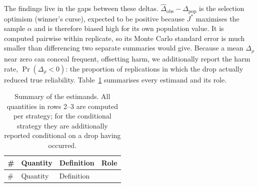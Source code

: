 \documentclass[
  nonatbib,
  authoryear,
  preprint]{elsarticle}
\begin{document}
The findings live in the gaps between these deltas.
\(\widehat{\Delta}_{\text{obs}} - \Delta_{\text{pop}}\) is the selection
optimism (winner's curse), expected to be positive because \(J^{*}\)
maximises the sample \(\alpha\) and is therefore biased high for its own
population value. It is computed pairwise within replicate, so its Monte
Carlo standard error is much smaller than differencing two separate
summaries would give. Because a mean \(\Delta_\rho\) near zero can
conceal frequent, offsetting harm, we additionally report the harm rate,
\(\Pr(\Delta_\rho < 0)\): the proportion of replications in which the
drop actually reduced true reliability. Table~\ref{tbl-estimands}
summarises every estimand and its role.

\begin{longtable}[]{@{}
  >{\raggedright\arraybackslash}p{}
  >{\raggedright\arraybackslash}p{}
  >{\raggedright\arraybackslash}p{}
  >{\raggedright\arraybackslash}p{}@{}}
\caption{Summary of the estimands. All quantities in rows 2--3 are
computed per strategy; for the conditional strategy they are
additionally reported conditional on a drop having
occurred.}\label{tbl-estimands}\tabularnewline
\toprule\noalign{}
\begin{minipage}[b]{\linewidth}\raggedright
\#
\end{minipage} & \begin{minipage}[b]{\linewidth}\raggedright
Quantity
\end{minipage} & \begin{minipage}[b]{\linewidth}\raggedright
Definition
\end{minipage} & \begin{minipage}[b]{\linewidth}\raggedright
Role
\end{minipage} \\
\midrule\noalign{}
\endfirsthead
\toprule\noalign{}
\begin{minipage}[b]{\linewidth}\raggedright
\#
\end{minipage} & \begin{minipage}[b]{\linewidth}\raggedright
Quantity
\end{minipage} & \begin{minipage}[b]{\linewidth}\raggedright
Definition
\end{minipage} & \begin{minipage}[b]{\linewidth}\raggedright

\end{minipage}
\end{longtable}
\end{document}
